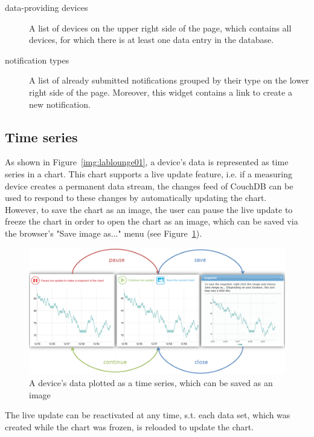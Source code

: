 \begin{description}
\item[data-providing devices] A list of devices on the upper right side of the page, which contains all devices, for which there is at least one data entry in the database.

\item[notification types] A list of already submitted notifications grouped by their type on the lower right side of the page. Moreover, this widget contains a link to create a new notification.
\end{description}

\subsection{Time series}
As shown in Figure~\ref{img:lablounge01}, a device's data is represented as time series in a chart. This chart supports a live update feature, i.e. if a measuring device creates a permanent data stream, the changes feed of CouchDB can be used to respond to these changes by automatically updating the chart.\\
However, to save the chart as an image, the user can pause the live update to freeze the chart in order to open the chart as an image, which can be saved via the browser's "Save image as..." menu (see Figure~\ref{img:labloungechart}).\\
\begin{figure}[h!]
\centering
\includegraphics[width=1.0\columnwidth]{images/labloungechart.png}
\caption{A device's data plotted as a time series, which can be saved as an image}
\label{img:labloungechart}
\end{figure}
The live update can be reactivated at any time, s.t. each data set, which was created while the chart was frozen, is reloaded to update the chart.

